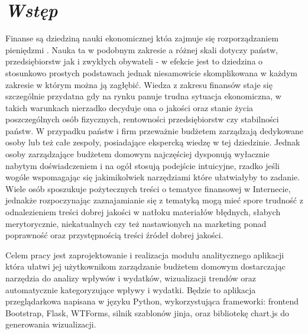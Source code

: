 \documentclass[a4paper,10pt, twoside]{report}
\newcommand{\customstylechapter}[1]{\large{\textit{#1}}}
\begin{document}
\null\newpage %

\renewcommand*\contentsname{Spis treści}
\tableofcontents                    %




\chapter{\customstylechapter{Wstęp}}
{Finanse są dziedziną nauki ekonomicznej któa zajmuje się rozporządzaniem 
pieniędzmi \cite{wiki_ekonomia}. Nauka ta w podobnym zakresie a różnej skali 
dotyczy państw, przedsiębiorstw jak i zwykłych obywateli - w efekcie jest to 
dziedzina o stosunkowo prostych podstawach jednak niesamowicie skomplikowana w 
każdym zakresie w którym można ją zagłębić. Wiedza z zakresu finansów staje się 
szczególnie przydatna gdy na rynku panuje trudna sytuacja ekonomiczna, w takich 
warunkach nierzadko decyduje ona o jakości oraz stanie życia poszczególnych 
osób fizycznych, rentowności przedsiębiorstw czy stabilności państw. W przypadku
 państw i firm przeważnie budżetem zarządzają dedykowane osoby lub też całe 
zespoły, posiadające ekspercką wiedzę w tej dziedzinie. Jednak osoby 
zarządzające budżetem domowym najczęściej dysponują wyłacznie nabytym 
doświadczeniem i na ogół stosują podejście intuicyjne, rzadko jeśli wogóle 
wspomagając się jakimikolwiek narzędziami które ułatwiałyby to zadanie. Wiele 
osób sposzukuje pożytecznych treści o tematyce finansowej w Internecie, jednakże 
rozpoczynając zaznajamianie się z tematyką mogą mieć spore trudność z 
odnalezieniem treści dobrej jakości w natłoku materiałów błędnych, słabych 
merytorycznie, niekatualnych czy też nastawionych na marketing ponad poprawność 
oraz przystępnością treści źródeł dobrej jakości.}

{Celem pracy jest zaprojektowanie i realizacja modułu analitycznego aplikacji 
która ułatwi jej użytkownikom zarządzanie budżetem domowym dostarczając 
narzędzia do analizy wpływów i wydatków, wizualizacji trendów oraz automatycznie 
kategoryzujące wpływy i wydatki. Będzie to aplikacja przeglądarkowa napisana w 
języku Python, wykorzystująca frameworki: frontend Bootstrap\cite{Bootstrap}, 
Flask\cite{Flask}, WTForms\cite{WTForms}, silnik szablonów jinja\cite{jinja}, 
oraz bibliotekę chart.js\cite{chart.js} do generowania wizualizacji.}
\end{document}
